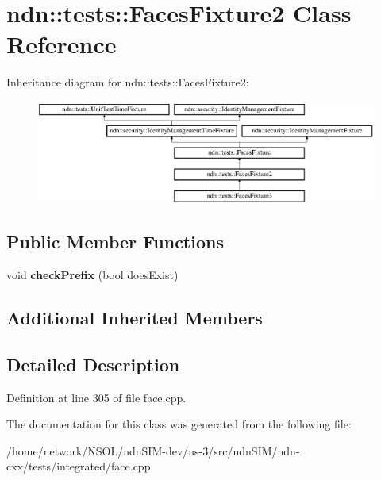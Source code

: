\hypertarget{classndn_1_1tests_1_1FacesFixture2}{}\section{ndn\+:\+:tests\+:\+:Faces\+Fixture2 Class Reference}
\label{classndn_1_1tests_1_1FacesFixture2}
Inheritance diagram for ndn\+:\+:tests\+:\+:Faces\+Fixture2\+:\begin{figure}[H]
\begin{center}
\leavevmode
\includegraphics[height=3.393939cm]{classndn_1_1tests_1_1FacesFixture2}
\end{center}
\end{figure}
\subsection*{Public Member Functions}
\begin{DoxyCompactItemize}
\item 
void {\bfseries check\+Prefix} (bool does\+Exist)\hypertarget{classndn_1_1tests_1_1FacesFixture2_aa0a70a0fbf62c7c2b5879d6a8a8112c3}{}\label{classndn_1_1tests_1_1FacesFixture2_aa0a70a0fbf62c7c2b5879d6a8a8112c3}

\end{DoxyCompactItemize}
\subsection*{Additional Inherited Members}


\subsection{Detailed Description}


Definition at line 305 of file face.\+cpp.



The documentation for this class was generated from the following file\+:\begin{DoxyCompactItemize}
\item 
/home/network/\+N\+S\+O\+L/ndn\+S\+I\+M-\/dev/ns-\/3/src/ndn\+S\+I\+M/ndn-\/cxx/tests/integrated/face.\+cpp\end{DoxyCompactItemize}
